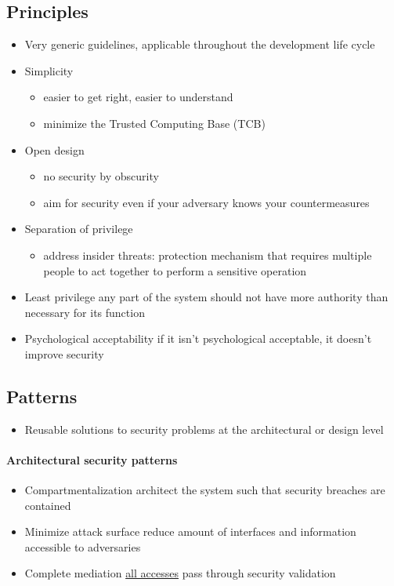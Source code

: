 \documentclass[12pt,titlepage,a4paper]{report}
\begin{document}
	\subsection{Principles}
	\begin{itemize}
		\item[\textrightarrow] Very generic guidelines, applicable throughout the development life cycle
		\item Simplicity
		\begin{itemize}
			\item easier to get right, easier to understand
			\item minimize the Trusted Computing Base (TCB)
		\end{itemize}
		\item Open design
		\begin{itemize}
			\item no security by obscurity
			\item aim for security even if your adversary knows your countermeasures
		\end{itemize}
		\item Separation of privilege
		\begin{itemize}
			\item address insider threats: protection mechanism that requires multiple people to act together to perform a sensitive operation
		\end{itemize}
		\item Least privilege
			\subitem any part of the system should not have more authority than necessary for its function
		\item Psychological acceptability
			\subitem if it isn't psychological acceptable, it doesn't improve security
	\end{itemize}
	
	\subsection{Patterns}
	\begin{itemize}
		\item[\textrightarrow] Reusable solutions to security problems at the architectural or design level
	\end{itemize}
	\paragraph{Architectural security patterns}
	\begin{itemize}
		\item Compartmentalization
			\subitem architect the system such that security breaches are contained
		\item Minimize attack surface
			 \subitem reduce amount of interfaces and information accessible to adversaries
	 	\item Complete mediation
	 		\subitem \underline{all accesses} pass through security validation
	\end{itemize}
\end{document}
